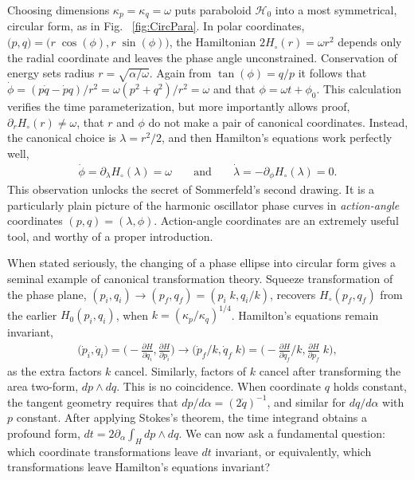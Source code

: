 \documentclass[nofootinbib,preprint]{revtex4-1}
\begin{document}
Choosing dimensions $\kappa_p = \kappa_q=\omega$ puts paraboloid $\mathcal{H}_0$ into a most 
symmetrical, circular form, as in Fig. ~\ref{fig:CircPara}. In polar coordinates, 
${\big(p,q\big)=\big(r\;\cos(\phi),r \;\sin(\phi)\big)}$,
the Hamiltonian $2H_{\circ}(r)=\omega r^2$ depends only the radial coordinate and leaves the phase angle 
unconstrained. Conservation of energy sets radius $r=\sqrt{\alpha/\omega}$. Again from 
$\tan(\phi) = q/p$ it follows that $\dot{\phi}=(p \dot{q}-\dot{p}q)/r^2=\omega(p^2+q^2)/r^2=\omega$ 
and that $\phi = \omega t + \phi_0$. This calculation verifies the time parameterization, but more 
importantly allows proof, $\partial_r H_{\circ}(r) \neq \omega$, that $r$ and $\phi$ do not make a 
pair of canonical coordinates. Instead, the canonical choice is $\lambda = r^2/2$, and then 
Hamilton's equations work perfectly well, 
\begin{eqnarray}
\dot{\phi}=\partial_{\lambda} H_{\circ}(\lambda) = \omega 
\;\;\;\;\;\;\; \text{and} \;\;\;\;\;\;\; 
\dot{\lambda}=-\partial_{\phi} H_{\circ}(\lambda) = 0 . \nonumber
\end{eqnarray}
This observation unlocks the secret of Sommerfeld's second drawing. It is a particularly
plain picture of the harmonic oscillator phase curves in \textit{action-angle}
coordinates $(p,q)=(\lambda,\phi)$. Action-angle coordinates are an extremely useful
tool, and worthy of a proper introduction.

When stated seriously, the changing of a phase ellipse into circular form gives a seminal 
example of canonical transformation theory. Squeeze transformation of the phase plane,
$(p_i,q_i) \rightarrow (p_f,q_f)=(p_i\;k,q_i/k)$, recovers $H_{\circ}(p_f,q_f)$ from the 
earlier $H_{0}(p_i,q_i)$, when  ${k=(\kappa_p/\kappa_q)^{1/4}}$. 
Hamilton's equations remain invariant, 
\begin{eqnarray}
\Big(\dot{p}_i,\dot{q}_i\Big) 
= \bigg(-\frac{\partial H }{\partial q_i}, \frac{\partial H}{\partial p_i} \bigg) \nonumber
\longrightarrow
\Big(\dot{p}_f/k,\dot{q}_f\;k\Big) 
= \bigg(-\frac{\partial H }{\partial q_f}/k, \frac{\partial H}{\partial p_f}\;k \bigg),
\end{eqnarray}
as the extra factors $k$ cancel. Similarly, factors of $k$ cancel after transforming
the area two-form, $dp \wedge dq$. This is no coincidence. When coordinate $q$ holds 
constant, the tangent geometry requires that $dp/d\alpha = (2\dot{q})^{-1}$, and similar for 
$dq/d\alpha$ with $p$ constant. After applying Stokes's theorem, the time integrand 
obtains a profound form, $dt=2\partial_{\alpha} \int_H dp\wedge dq$. We can now ask a fundamental
question: which coordinate transformations leave $dt$ invariant, or equivalently, which 
transformations leave Hamilton's equations invariant?
\end{document}
